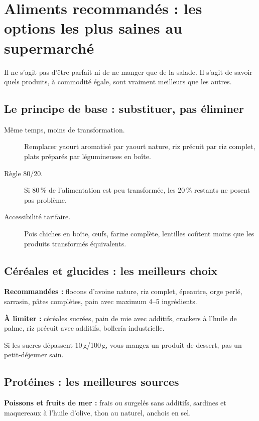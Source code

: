 \documentclass[a5paper,12pt,oneside,openany]{book}
\newcommand{\boxjaune}[2]{%
  \begin{tcolorbox}[boitebase,
    colback=jaune!12!white, colframe=jaune!80!black, title={#1}]
  #2\end{tcolorbox}}
\begin{document}
\chapter{Aliments recommandés : les options les plus saines au supermarché}

Il ne s'agit pas d'être parfait ni de ne manger que de la salade. Il s'agit
de savoir quels produits, à commodité égale, sont vraiment meilleurs que
les autres.

\section{Le principe de base : substituer, pas éliminer}

\begin{description}
  \item[Même temps, moins de transformation.] Remplacer yaourt aromatisé par
    yaourt nature, riz précuit par riz complet, plats préparés par légumineuses
    en boîte.
  \item[Règle 80/20.] Si 80\,\% de l'alimentation est peu transformée, les
    20\,\% restants ne posent pas problème.
  \item[Accessibilité tarifaire.] Pois chiches en boîte, œufs, farine complète,
    lentilles coûtent moins que les produits transformés équivalents.
\end{description}

\section{Céréales et glucides : les meilleurs choix}

\textbf{Recommandées :} flocons d'avoine nature, riz complet, épeautre, orge
perlé, sarrasin, pâtes complètes, pain avec maximum 4--5 ingrédients.

\textbf{À limiter :} céréales sucrées, pain de mie avec additifs, crackers à
l'huile de palme, riz précuit avec additifs, bollería industrielle.

\boxjaune{Astuce}{Si les sucres dépassent 10\,g/100\,g, vous mangez un produit
de dessert, pas un petit-déjeuner sain.}

\section{Protéines : les meilleures sources}

\textbf{Poissons et fruits de mer :} frais ou surgelés sans additifs, sardines
et maquereaux à l'huile d'olive, thon au naturel, anchois en sel.
\end{document}
